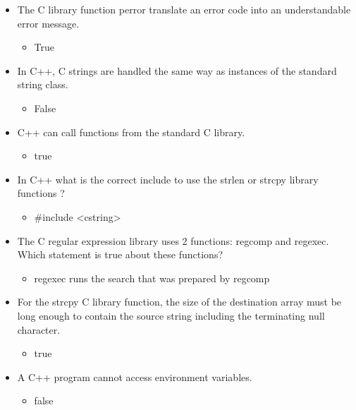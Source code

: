 \documentclass{report}
\begin{document}
    \pagebreak 
    \begin{itemize}
        \item The C library function perror translate an error code into an understandable error message.
            \begin{itemize}
                \item True
            \end{itemize}
        \item In C++, C strings are handled the same way as instances of the standard string class.
            \begin{itemize}
                \item False
            \end{itemize}
        \item C++ can call functions from the standard C library. 
            \begin{itemize}
                \item true
            \end{itemize}
        \item In C++ what is the correct include to use the strlen or strcpy library functions ?
            \begin{itemize}
                \item #include <cstring>
            \end{itemize}
        \item The C regular expression library uses 2 functions: regcomp and regexec. Which statement is true about these functions?
            \begin{itemize}
                \item regexec runs the search that was prepared by regcomp
            \end{itemize}
        \item For the strcpy C library function, the size of the destination array must be long enough to contain the source string including the terminating null character.
            \begin{itemize}
                \item true
            \end{itemize}
        \item A C++ program cannot access environment variables.
            \begin{itemize}
                \item false
            \end{itemize}

\end{itemize}
\end{document}
